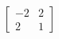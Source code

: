 \documentclass[preview]{standalone}
\begin{document}
\begin{center}
$\begin{bmatrix} -2 & 2 \\ 2 & 1 \end{bmatrix}$
\end{center}
\end{document}
